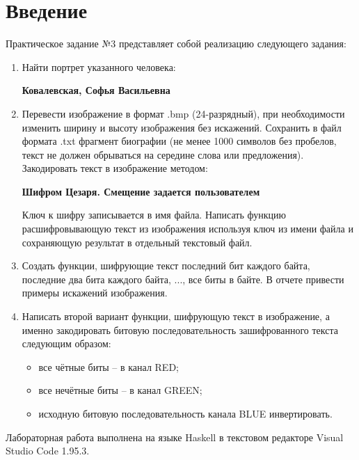 \documentclass[11pt,a4paper,final]{article} %
\begin{document}
\newpage

\tableofcontents

\newpage
\section*{Введение}
Практическое задание №3 представляет собой реализацию следующего задания: 

\begin{enumerate}
	\item Найти портрет указанного человека:
	\begin{center}
		\textbf{Ковалевская, Софья Васильевна}
	\end{center}
	\item Перевести изображение в формат .bmp (24-разрядный), при необходимости изменить ширину и высоту изображения без искажений. Сохранить в файл формата .txt фрагмент биографии (не менее 1000 символов без пробелов, текст не должен обрываться на середине слова или предложения). Закодировать текст в изображение методом: 

	\begin{center}
		\textbf{Шифром Цезаря. Смещение задается пользователем}
	\end{center}
	Ключ к шифру записывается в имя файла. Написать функцию расшифровывающую текст из изображения используя ключ из имени файла и сохраняющую результат в отдельный текстовый файл.
	
	\item Создать функции, шифрующие текст последний бит каждого байта, последние два бита каждого байта, ..., все биты в байте. В отчете привести примеры искажений изображения.
	
	\item Написать второй вариант функции, шифрующую текст в изображение, а именно закодировать битовую последовательность зашифрованного текста следующим образом: 
	\begin{itemize}
		\item все чётные биты -- в канал RED;
		\item все нечётные биты -- в канал GREEN;
		\item исходную битовую последовательность канала BLUE инвертировать.
	\end{itemize}
\end{enumerate}

\par Лабораторная работа выполнена на языке Haskell в текстовом редакторе Visual Studio Code 1.95.3.
\end{document}
